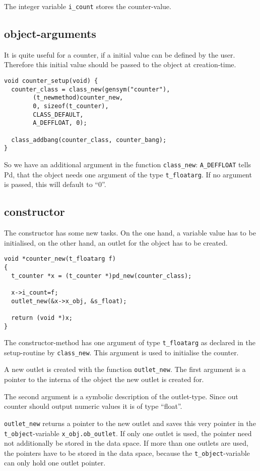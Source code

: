 \documentclass[12pt, a4paper,english,titlepage]{article}
\begin{document}
The integer variable \verb+i_count+ stores the counter-value.

\subsection{object-arguments}
It is quite useful for a counter, if a initial value can be defined by the user.
Therefore this initial value should be passed to the object at creation-time.

\begin{verbatim}
void counter_setup(void) {
  counter_class = class_new(gensym("counter"),
        (t_newmethod)counter_new,
        0, sizeof(t_counter),
        CLASS_DEFAULT,
        A_DEFFLOAT, 0);

  class_addbang(counter_class, counter_bang);
}
\end{verbatim}

So we have an additional argument in the function \verb+class_new+:
\verb+A_DEFFLOAT+ tells Pd, that the object needs one argument of the 
type \verb+t_floatarg+.
If no argument is passed, this will default to ``0''.

\subsection{constructor}
The constructor has some new tasks.
On the one hand, a variable value has to be initialised,
on the other hand, an outlet for the object has to be created.

\begin{verbatim}
void *counter_new(t_floatarg f)
{
  t_counter *x = (t_counter *)pd_new(counter_class);

  x->i_count=f;
  outlet_new(&x->x_obj, &s_float);

  return (void *)x;
}
\end{verbatim}

The constructor-method has one argument of type \verb+t_floatarg+ as declared
in the setup-routine by \verb+class_new+.
This argument is used to initialise the counter.

A new outlet is created with the function \verb+outlet_new+.
The first argument is a pointer to the interna of the object
the new outlet is created for.

The second argument is a symbolic description of the outlet-type.
Since out counter should output numeric values it is of type ``float''.

\verb+outlet_new+ returns a pointer to the new outlet and saves this very pointer
in the \verb+t_object+-variable \verb+x_obj.ob_outlet+.
If only one outlet is used, the pointer need not additionally be stored in the data space.
If more than one outlets are used, the pointers have to be stored in the data space,
because the \verb+t_object+-variable can only hold one outlet pointer.
\end{document}
